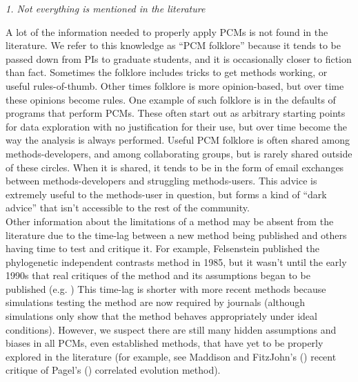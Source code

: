 \documentclass[a4paper,12pt]{article}
\renewcommand{\subsection}[1]{
  \bigskip
  \begin{center}
  \begin{large}
  \normalfont\itshape #1
  \end{large}
  \end{center}
}
\begin{document}
\subsection{1. Not everything is mentioned in the literature}
A lot of the information needed to properly apply PCMs is not found in the literature. 
We refer to this knowledge as ``PCM folklore'' because it tends to be passed down from PIs to graduate students, and it is occasionally closer to fiction than fact.
Sometimes the folklore includes tricks to get methods working, or useful rules-of-thumb. 
Other times folklore is more opinion-based, but over time these opinions become rules. 
One example of such folklore is in the defaults of programs that perform PCMs. 
These often start out as arbitrary starting points for data exploration with no justification for their use, but over time become the way the analysis is always performed.
Useful PCM folklore is often shared among methods-developers, and among collaborating groups, but is rarely shared outside of these circles. 
When it is shared, it tends to be in the form of email exchanges between methods-developers and struggling methods-users.
This advice is extremely useful to the methods-user in question, but forms a kind of ``dark advice'' that isn't accessible to the rest of the community.\\


Other information about the limitations of a method may be absent from the literature due to the time-lag between a new method being published and others having time to test and critique it. 
For example, Felsenstein published the phylogenetic independent contrasts method in 1985, but it wasn't until the early 1990s that real critiques of the method and its assumptions began to be published (e.g. \citealp{garland1992procedures})
This time-lag is shorter with more recent methods because simulations testing the method are now required by journals (although simulations only show that the method behaves appropriately under ideal conditions).
However, we suspect there are still many hidden assumptions and biases in all PCMs, even established methods, that have yet to be properly explored in the literature (for example, see Maddison and FitzJohn's (\citeyear{maddison2014unsolved}) recent critique of Pagel's (\citeyear{pagel1994detecting}) correlated evolution method).
\end{document}
